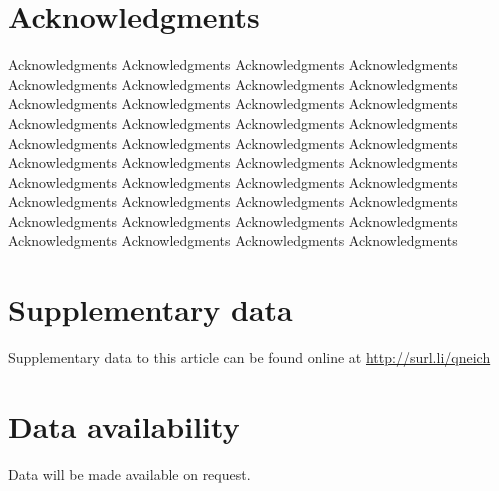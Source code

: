 \documentclass[a4paper,fleqn]{cas-sc}
\begin{document}
\section*{Acknowledgments}
Acknowledgments Acknowledgments Acknowledgments Acknowledgments Acknowledgments Acknowledgments Acknowledgments Acknowledgments Acknowledgments Acknowledgments Acknowledgments Acknowledgments Acknowledgments Acknowledgments Acknowledgments Acknowledgments Acknowledgments Acknowledgments Acknowledgments Acknowledgments Acknowledgments Acknowledgments Acknowledgments Acknowledgments Acknowledgments Acknowledgments Acknowledgments Acknowledgments Acknowledgments Acknowledgments Acknowledgments Acknowledgments Acknowledgments Acknowledgments Acknowledgments Acknowledgments Acknowledgments Acknowledgments Acknowledgments Acknowledgments 
\section*{Supplementary data}\label{SuplData}
Supplementary data to this article can be found online at
\url{http://surl.li/qneich}

\section*{Data availability}
Data will be made available on request.





%


\end{document}
